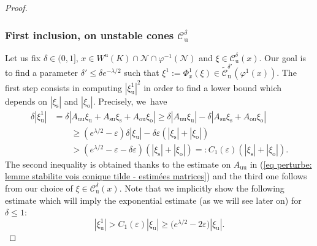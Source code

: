 \documentclass[11pt]{article}
\newcommand{\ro}{\mathrm{o}}
\newcommand{\rs}{\mathrm{s}}
\newcommand{\ru}{\mathrm{u}}
\theoremstyle{definition}
\theoremstyle{plain}
\newcommand{\Ccal}{\mathcal{C}}
\newcommand{\Ncal}{\mathcal{N}}
\begin{document}
\begin{proof}
\subsubsection*{First inclusion, on unstable cones $\Ccal_\ru^{\delta}$} Let us fix $\delta\in(0,1]$, $x \in W^\ru (K) \cap \Ncal \cap \varphi^{-1} (\Ncal)$ and $\xi \in \Ccal_\ru^{\delta} (x)$. Our goal is to find a parameter $\delta' \leq \delta e^{-\lambda/2} $ such that $\xi^1:= \Phi_x^1 (\xi) \in \widetilde {\Ccal}_\ru^{\delta'} (\varphi^1 (x))$. The first step consists in computing $|\xi_\ru^1|^2$ in order to find a lower bound which depends on $|\xi_\rs|$ and $|\xi_\ro|$. Precisely, we~have
\begin{equation}\label{eq: proof perturb vois conique tilde - lower bound unstable}
\begin{split}
\delta |\xi_\ru^1| &= \delta |A_{\ru\ru} \xi_\ru + A_{\rs\ru} \xi_\rs + A_{\ro\ru} \xi_\ro | \geq \delta |A_{\ru\ru} \xi_\ru| - \delta |A_{\rs\ru} \xi_\rs + A_{\ro\ru} \xi_\ro | \\
&\qquad \geq (e^{\lambda/2} -\varepsilon) \delta | \xi_\ru| - \delta \varepsilon (|\xi_\rs| + |\xi_\ro|) \\
& \qquad > (e^{\lambda/2} -\varepsilon - \delta \varepsilon) (|\xi_\rs| + |\xi_\ro|) =: C_1 (\varepsilon) (|\xi_\rs| + |\xi_\ro|).
\end{split}
\end{equation}
The second inequality is obtained thanks to the estimate on $A_{\ru\ru}$ in (\ref{eq perturbe: lemme stabilite vois conique tilde - estimées matrices}) and the third one follows from our choice of $\xi \in \Ccal_\ru^{\delta} (x)$. Note that we implicitly show the following estimate which will imply the exponential estimate (as we will see later on) for $\delta \leq 1$:
\begin{equation}\label{inequality intermediate exponential bound}
|\xi_\ru^1| > C_1 (\varepsilon) |\xi_\ru| \geq \bigl(e^{\lambda/2} -2\varepsilon \bigr) |\xi_\ru|.
\end{equation}


\end{proof}
\end{document}
